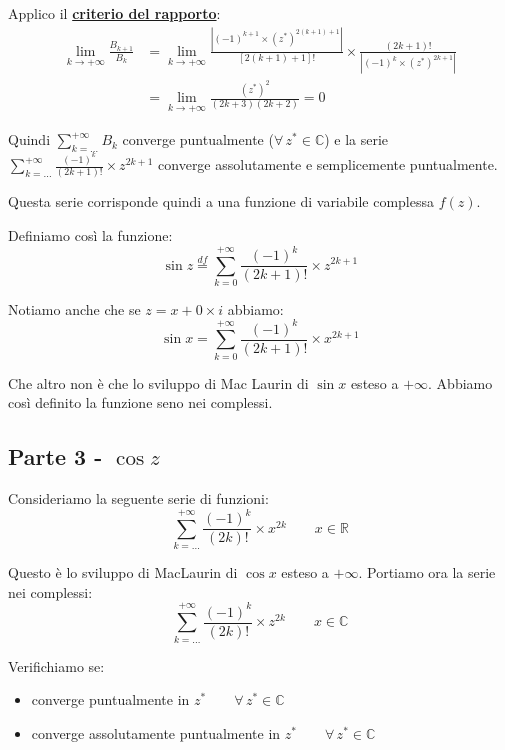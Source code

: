 \documentclass[../../dimostrazioni]{subfiles}
\begin{document}
                Applico il \textbf{\hyperref[criterioRapportoSerie]{criterio del rapporto}}:
                \begin{align*}
                    \lim_{k \to +\infty} \frac{B_{k+1}}{B_k} &= \lim_{k \to +\infty} \frac{\left| (-1)^{k+1} \times (z^*)^{2(k+1)+1}\right|}{\left[2(k+1)+1\right]!} \times \frac{\left(2k+1\right)!}{\left| (-1)^k \times (z^*)^{2k+1}\right|} \\
                    &= \lim_{k \to +\infty} \frac{(z^*)^2}{(2k+3)(2k+2)} = 0
                \end{align*}

                Quindi \(\sum_{k=\dots}^{+\infty} B_k\) converge puntualmente (\(\forall \, z^* \in \mathbb{C}\)) 
                e la serie  \(\sum_{k=\dots}^{+\infty} \frac{(-1)^k}{(2k+1)!} \times z^{2k+1}\) converge assolutamente e semplicemente puntualmente.

                Questa serie corrisponde quindi a una funzione di variabile complessa \(f(z)\).

                Definiamo così la funzione:
                \[  \sin z \stackrel{df}{=} \sum_{k=0}^{+\infty} \frac{(-1)^k}{(2k+1)!} \times z^{2k+1}    \]

                Notiamo anche che se \(z = x + 0 \times i\) abbiamo:
                \[  \sin x = \sum_{k=0}^{+\infty} \frac{(-1)^k}{(2k+1)!} \times x^{2k+1} \]

                Che altro non è che lo sviluppo di Mac Laurin di \(\sin x\) esteso a \(+\infty\). 
                Abbiamo così definito la funzione seno nei complessi.

            \subsection*{Parte 3 - \(\cos z\)}

                Consideriamo la seguente serie di funzioni:
                \[  \sum_{k=\dots}^{+\infty} \frac{(-1)^k}{(2k)!} \times x^{2k} \qquad x \in \mathbb{R}  \]

                Questo è lo sviluppo di MacLaurin di \(\cos x\) esteso a \(+ \infty\). Portiamo ora la serie nei complessi:
                \[  \sum_{k=\dots}^{+\infty} \frac{(-1)^k}{(2k)!} \times z^{2k} \qquad x \in \mathbb{C}  \]

                \newpage

                Verifichiamo se:
                \begin{itemize}
                    \item converge puntualmente in \(z^* \qquad \forall \, z^*  \in \mathbb{C}\)
                    \item converge assolutamente puntualmente in \(z^* \qquad \forall \, z^*  \in \mathbb{C}\)
                \end{itemize}
            
\end{document}
